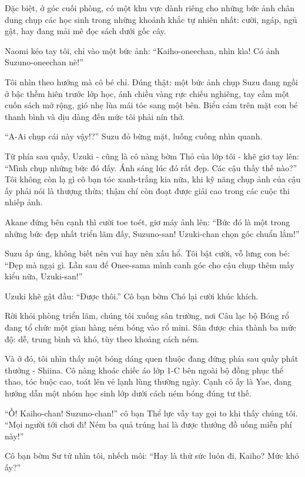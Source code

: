 \documentclass[../main.tex]{subfiles}
\begin{document}
Đặc biệt, ở góc cuối phòng, có một khu vực dành riêng cho những bức ảnh chân dung chụp các học sinh trong những khoảnh khắc tự nhiên nhất: cười, ngáp, ngủ gật, hay đang mải mê đọc sách dưới gốc cây.

Naomi kéo tay tôi, chỉ vào một bức ảnh: ``Kaiho-oneechan, nhìn kìa! Có ảnh Suzuno-oneechan nè!''

Tôi nhìn theo hướng mà cô bé chỉ. Đúng thật: một bức ảnh chụp Suzu đang ngồi ở bậc thềm hiên trước lớp học, ánh chiều vàng rực chiếu nghiêng, tay cầm một cuốn sách mở rộng, gió nhẹ lùa mái tóc sang một bên. Biểu cảm trên mặt con bé thanh bình và dịu dàng đến mức tôi phải nín thở.

``A-Ai chụp cái này vậy!?'' Suzu đỏ bừng mặt, luống cuống nhìn quanh.

Từ phía sau quầy, Uzuki - cũng là cô nàng bờm Thỏ của lớp tôi - khẽ giơ tay lên: ``Mình chụp những bức đó đấy. Ánh sáng lúc đó rất đẹp. Các cậu thấy thế nào?'' Tôi không còn lạ gì cô bạn tóc xanh-trắng kia nữa, khi kỹ năng chụp ảnh của cậu ấy phải nói là thượng thừa; thậm chí còn đoạt được giải cao trong các cuộc thi nhiếp ảnh.

Akane đứng bên cạnh thì cười toe toét, giơ máy ảnh lên: ``Bức đó là một trong những bức đẹp nhất triển lãm đấy, Suzuno-san! Uzuki-chan chọn góc chuẩn lắm!''

Suzu ấp úng, không biết nên vui hay nên xấu hổ. Tôi bật cười, vỗ lưng con bé: ``Đẹp mà ngại gì. Lần sau để Onee-sama mình canh góc cho cậu chụp thêm mấy kiểu nữa, Uzuki-san!''

Uzuki khẽ gật đầu: ``Được thôi.'' Cô bạn bờm Chó lại cười khúc khích.

Rời khỏi phòng triển lãm, chúng tôi xuống sân trường, nơi Câu lạc bộ Bóng rổ đang tổ chức một gian hàng ném bóng vào rổ mini. Sân được chia thành ba mức độ: dễ, trung bình và khó, tùy theo khoảng cách ném.

Và ở đó, tôi nhìn thấy một bóng dáng quen thuộc đang đứng phía sau quầy phát thưởng - Shiina. Cô nàng khoác chiếc áo lớp 1-C bên ngoài bộ đồng phục thể thao, tóc buộc cao, toát lên vẻ lạnh lùng thường ngày. Cạnh cô ấy là Yae, đang hướng dẫn một nhóm học sinh lớp dưới cách ném bóng đúng tư thế.

``Ồ! Kaiho-chan! Suzuno-chan!'' cô bạn Thể lực vẫy tay gọi to khi thấy chúng tôi. ``Mọi người tới chơi đi! Ném ba quả trúng hai là được thưởng đồ uống miễn phí này!''

Cô bạn bờm Sư tử nhìn tôi, nhếch môi: ``Hay là thử sức luôn đi, Kaiho? Mức khó ấy?''
\end{document}
